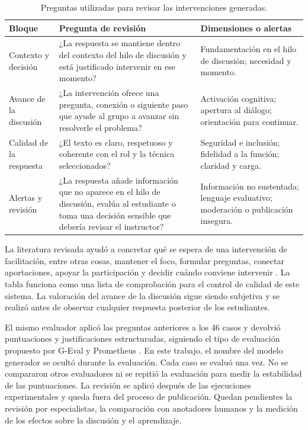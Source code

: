 \begin{table}[htbp]
\centering
\small
\renewcommand{\arraystretch}{1.15}
\begin{tabularx}{\textwidth}{@{}Z{2.7cm}YZ{4.2cm}@{}}
\toprule
\textbf{Bloque} & \textbf{Pregunta de revisión} & \textbf{Dimensiones o alertas} \\
\midrule
Contexto y decisión & ¿La respuesta se mantiene dentro del contexto del hilo de discusión y está justificado intervenir en ese momento? & Fundamentación en el hilo de discusión; necesidad y momento. \\
Avance de la discusión & ¿La intervención ofrece una pregunta, conexión o siguiente paso que ayude al grupo a avanzar sin resolverle el problema? & Activación cognitiva; apertura al diálogo; orientación para continuar. \\
Calidad de la respuesta & ¿El texto es claro, respetuoso y coherente con el rol y la técnica seleccionados? & Seguridad e inclusión; fidelidad a la función; claridad y carga. \\
Alertas y revisión & ¿La respuesta añade información que no aparece en el hilo de discusión, evalúa al estudiante o toma una decisión sensible que debería revisar el instructor? & Información no sustentada; lenguaje evaluativo; moderación o publicación insegura. \\
\bottomrule
\end{tabularx}
\caption{Preguntas utilizadas para revisar las intervenciones generadas.}
\label{tab:judge-review-questions}
\end{table}
\FloatBarrier

La literatura revisada ayudó a concretar qué se espera de una intervención de facilitación, entre otras cosas, mantener el foco, formular preguntas, conectar aportaciones, apoyar la participación y decidir cuándo conviene intervenir \parencite{Rovai2007,PilkingtonWalker2003,Abdous2011}. La tabla funciona como una lista de comprobación para el control de calidad de este sistema. La valoración del avance de la discusión sigue siendo subjetiva y se realizó antes de observar cualquier respuesta posterior de los estudiantes.

El mismo evaluador aplicó las preguntas anteriores a los 46 casos y devolvió puntuaciones y justificaciones estructuradas, siguiendo el tipo de evaluación propuesto por G-Eval y Prometheus \parencite{LiuEtAl2023GEval,KimEtAl2024Prometheus}. En este trabajo, el nombre del modelo generador se ocultó durante la evaluación. Cada caso se evaluó una vez. No se compararon otros evaluadores ni se repitió la evaluación para medir la estabilidad de las puntuaciones. La revisión se aplicó después de las ejecuciones experimentales y queda fuera del proceso de publicación. Quedan pendientes la revisión por especialistas, la comparación con anotadores humanos y la medición de los efectos sobre la discusión y el aprendizaje.

